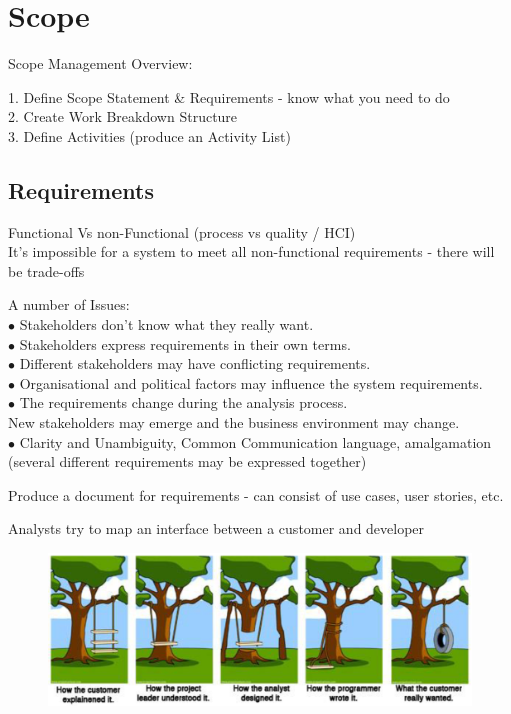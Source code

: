 \documentclass[]{project_plan}
\newcommand{\bulletPoint}{\hspace{-3.1pt}$\bullet$ \hspace{5pt}}
\begin{document}
\section{Scope}

Scope Management Overview:

1. Define Scope Statement \& Requirements - know what you need to do\\
2. Create Work Breakdown Structure\\
3. Define Activities (produce an Activity List)\\

\subsection{Requirements}

Functional Vs non-Functional (process vs quality / HCI)\\
It's impossible for a system to meet all non-functional requirements - there will be trade-offs

A number of Issues:\\
\bulletPoint Stakeholders don’t know what they really want.\\
\bulletPoint Stakeholders express requirements in their own terms.\\
\bulletPoint Different stakeholders may have conflicting requirements.\\
\bulletPoint Organisational and political factors may influence the system requirements.\\
\bulletPoint The requirements change during the analysis process.\\New stakeholders may emerge and the business environment may change.\\
\bulletPoint Clarity and Unambiguity, Common Communication language, amalgamation (several different requirements may be expressed together)

Produce a document for requirements - can consist of use cases, user stories, etc.

Analysts try to map an interface between a customer and developer

\begin{figure}[h!]
  \centering
  \includegraphics[width=\linewidth]{understanding_requirements.png}
\end{figure}
\end{document}
